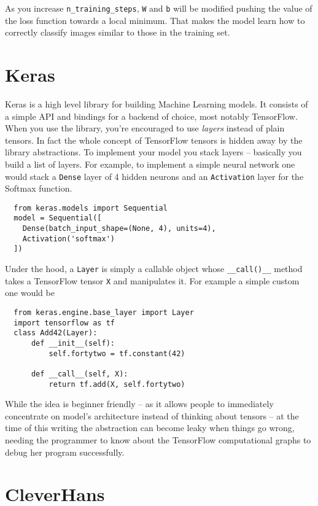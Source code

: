 As you increase \texttt{n\_training\_steps}, \texttt{W} and \texttt{b}
will be modified pushing the value of the loss function towards a local
minimum. That makes the model learn how to correctly classify images
similar to those in the training set.

\section{Keras}
\label{sec:keras}

Keras is a high level library for building Machine Learning models. It
consists of a simple API and bindings for a backend of choice, most
notably TensorFlow. When you use the library, you're encouraged to use
\emph{layers} instead of plain tensors. In fact the whole concept of
TensorFlow tensors is hidden away by the library abstractions. To
implement your model you stack layers -- basically you build a list of
layers. For example, to implement a simple neural network one would
stack a \texttt{Dense} layer of 4 hidden neurons and an
\texttt{Activation} layer for the Softmax function.

\begin{verbatim}
  from keras.models import Sequential
  model = Sequential([
    Dense(batch_input_shape=(None, 4), units=4),
    Activation('softmax')
  ])
\end{verbatim}

Under the hood, a \texttt{Layer} is simply a callable object whose
\texttt{\_\_call()\_\_} method takes a TensorFlow tensor \texttt{X} and
manipulates it. For example a simple custom one would be
\begin{verbatim}
  from keras.engine.base_layer import Layer
  import tensorflow as tf
  class Add42(Layer):
      def __init__(self):
          self.fortytwo = tf.constant(42)

      def __call__(self, X):
          return tf.add(X, self.fortytwo)
\end{verbatim}

While the idea is beginner friendly -- as it allows people to
immediately concentrate on model's architecture instead of thinking
about tensors -- at the time of this writing the abstraction can become
leaky when things go wrong, needing the programmer to know about
the TensorFlow computational graphs to debug her program successfully.

\section{CleverHans}
\label{sec:cleverhans}

